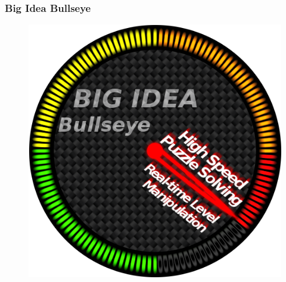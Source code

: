 \documentclass[xcolor=dvipsnames]{beamer}
\begin{document}
	\begin{frame}
		\frametitle{Big Idea Bullseye}
		\begin{figure}
			\centering
			\includegraphics[scale=.4]{images/bigIdeaBullseye}
		\end{figure}
	\end{frame}
	
\end{document}
